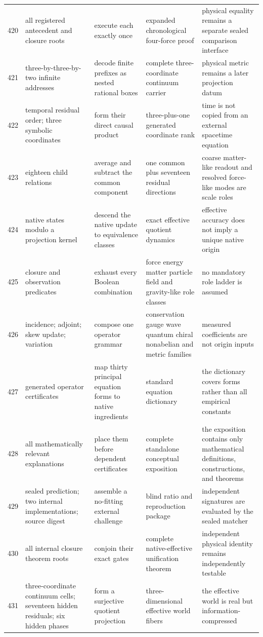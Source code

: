 \documentclass[11pt]{article}
\numberwithin{equation}{section}
\theoremstyle{remark}
\begin{document}
\begin{landscape}
\begin{longtable}{p{0.65cm}p{3.5cm}p{4.0cm}p{4.0cm}p{4.6cm}}
420&all registered antecedent and closure roots&execute each exactly once&expanded chronological four-force proof&physical equality remains a separate sealed comparison interface\\
421&three-by-three-by-two infinite addresses&decode finite prefixes as nested rational boxes&complete three-coordinate continuum carrier&physical metric remains a later projection datum\\
422&temporal residual order; three symbolic coordinates&form their direct causal product&three-plus-one generated coordinate rank&time is not copied from an external spacetime equation\\
423&eighteen child relations&average and subtract the common component&one common plus seventeen residual directions&coarse matter-like readout and resolved force-like modes are scale roles\\
424&native states modulo a projection kernel&descend the native update to equivalence classes&exact effective quotient dynamics&effective accuracy does not imply a unique native origin\\
425&closure and observation predicates&exhaust every Boolean combination&force energy matter particle field and gravity-like role classes&no mandatory role ladder is assumed\\
426&incidence; adjoint; skew update; variation&compose one operator grammar&conservation gauge wave quantum chiral nonabelian and metric families&measured coefficients are not origin inputs\\
427&generated operator certificates&map thirty principal equation forms to native ingredients&standard equation dictionary&the dictionary covers forms rather than all empirical constants\\
428&all mathematically relevant explanations&place them before dependent certificates&complete standalone conceptual exposition&the exposition contains only mathematical definitions, constructions, and theorems\\
429&sealed prediction; two internal implementations; source digest&assemble a no-fitting external challenge&blind ratio and reproduction package&independent signatures are evaluated by the sealed matcher\\
430&all internal closure theorem roots&conjoin their exact gates&complete native-effective unification theorem&independent physical identity remains independently testable\\
431&three-coordinate continuum cells; seventeen hidden residuals; six hidden phases&form a surjective quotient projection&three-dimensional effective world fibers&the effective world is real but information-compressed\\

\end{longtable}
\end{landscape}
\end{document}
